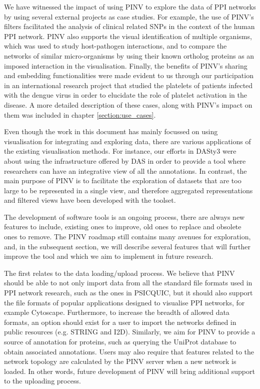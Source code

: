 We have witnessed the impact of using PINV to explore the data of PPI networks by using several external projects as case studies. For example, the use of PINV's filters facilitated the analysis of clinical related SNPs in the context of the human PPI network. PINV also supports the visual identification of multiple organisms, which was used to study host-pathogen interactions, and to compare the networks of similar micro-organisms by using their known ortholog proteins as an imposed interaction in the visualisation. Finally, the benefits of PINV's sharing and embedding functionalities were made evident to us through our participation in an international research project that studied the platelets of patients infected with the dengue virus in order to elucidate the role of platelet activation in the disease.  A more detailed description of these cases, along with PINV's impact on them was included in chapter \ref{section:use_cases}.

Even though the work in this document has mainly focussed on using visualisation for integrating and exploring data, there are various applications of the existing visualisation methods. For instance, our efforts in DASty3 were about using the infrastructure offered by DAS in order to provide a tool where researchers can have an integrative view of all the annotations. In contrast, the main purpose of PINV is to facilitate the exploration of datasets that are too large to be represented in a single view, and therefore aggregated representations and filtered views have been developed with the toolset.

The development of software tools is an ongoing process, there are always new features to include, existing ones to improve, old ones to replace and obsolete ones to remove. The PINV roadmap still contains many avenues for exploration, and, in the subsequent section, we will describe several features that will further improve the tool and which we aim to implement in future research.

The first relates to the data loading/upload process. We believe that PINV should be able to not only import data from all the standard file formats used in PPI network research, such as the ones in PSICQUIC, but it should also support the file formats of popular applications designed to visualise PPI networks, for example Cytoscape. Furthermore, to increase the breadth of allowed data formats, an option should exist for a user to import the networks defined in public resources (e.g. STRING and I2D). Similarly, we aim for PINV to provide a source of annotation for proteins, such as querying the UniProt database to obtain associated annotations. Users may also require that features related to the network topology are calculated by the PINV server when a new network is loaded. In other words, future development of PINV will bring additional support to the uploading process.

